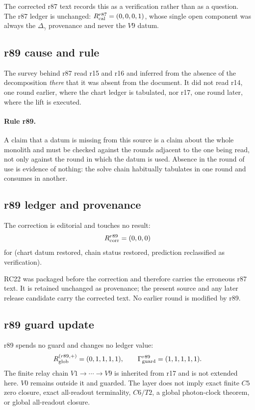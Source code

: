 The corrected r87 text records this as a verification rather than as a question.  The r87
ledger is unchanged: \(R_{\rm cal}^{r87}=(0,0,0,1)\), whose single open component was always
the \(\Delta_\gamma\) provenance and never the \(V9\) datum.

\subsection*{r89 cause and rule}
\label{subsec:r89-cause-and-rule}

The survey behind r87 read r15 and r16 and inferred from the absence of the decomposition
\emph{there} that it was absent from the document.  It did not read r14, one round earlier,
where the chart ledger is tabulated, nor r17, one round later, where the lift is executed.

\paragraph{Rule r89.}
A claim that a datum is missing from this source is a claim about the whole monolith and must
be checked against the rounds adjacent to the one being read, not only against the round in
which the datum is used.  Absence in the round of use is evidence of nothing: the solve chain
habitually tabulates in one round and consumes in another.

\subsection*{r89 ledger and provenance}
\label{subsec:r89-ledger-provenance}

The correction is editorial and touches no result:
\[
R_{\rm corr}^{r89}=(0,0,0)
\]
for (chart datum restored, chain status restored, prediction reclassified as verification).

RC22 was packaged before the correction and therefore carries the erroneous r87 text.  It is
retained unchanged as provenance; the present source and any later release candidate carry
the corrected text.  No earlier round is modified by r89.

\subsection*{r89 guard update}
\label{subsec:r89-guard-update}

r89 spends no guard and changes no ledger value:
\[
R_{\rm glob}^{(r89,+)}=(0,1,1,1,1),
\qquad
\Gamma_{\rm guard}^{r89}=(1,1,1,1,1).
\]
The finite relay chain \(V1\to\cdots\to V9\) is inherited from r17 and is not extended here.
\(V0\) remains outside it and guarded.  The layer does not imply exact finite \(C5\) zero
closure, exact all-readout terminality, \(C6/T2\), a global photon-clock theorem, or
global all-readout closure.


